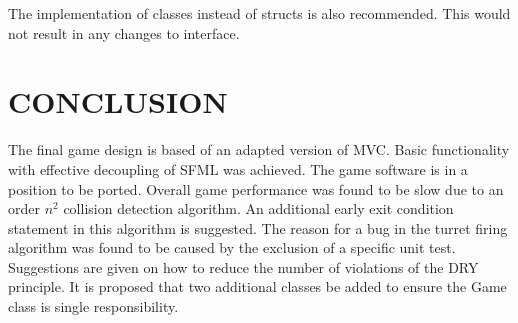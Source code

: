 \documentclass[10pt,twocolumn]{witseiepaper}
\begin{document}
The implementation of classes instead of structs is also recommended. This would not result in any changes to interface.

%
\section{CONCLUSION} %
The final game design is based of an adapted version of MVC. Basic functionality with effective decoupling of SFML was achieved. The game software is in a position to be ported. Overall game performance was found to be slow due to an order $ n^{2} $ collision detection algorithm. An additional early exit condition statement in this algorithm is suggested. The reason for a bug in the turret firing algorithm was found to be caused by the exclusion of a specific unit test. Suggestions are given on how to reduce the number of violations of the DRY principle. It is proposed that two additional classes be added to ensure the Game class is single responsibility.

\balance

%


\end{document}
